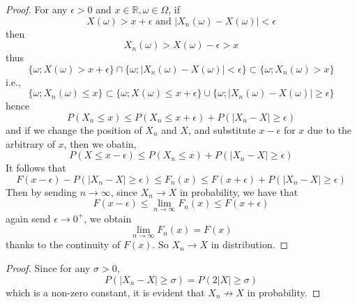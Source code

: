 \begin{subproblem}
        \item
        \begin{proof}
            For any $\epsilon>0$ and $x\in\mathbb R,\omega\in\Omega$,
            if
            \[X(\omega)>x+\epsilon\text{ and }
            |X_n(\omega)-X(\omega)|<\epsilon\]
            then
            \[X_n(\omega)>X(\omega)-\epsilon>x\]
            thus
            \[\{\omega;X(\omega)>x+\epsilon\}\cap
            \{\omega;|X_n(\omega)-X(\omega)|<\epsilon\}
            \subset \{\omega;X_n(\omega)>x\}\]
            i.e.,
            \[\{\omega;X_n(\omega)\leq x\}
            \subset\{\omega;X(\omega)\leq x+\epsilon\}
            \cup\{\omega;|X_n(\omega)-X(\omega)|\geq\epsilon\}\]
            hence
            \[P(X_n\leq x)\leq P(X_n\leq x+\epsilon)+P(|X_n-X|\geq\epsilon)\]
            and if we change the position of $X_n$ and $X$, and substitute
            $x-\epsilon$ for $x$ due to the arbitrary of $x$, then we obatin,
            \[P(X\leq x-\epsilon)\leq P(X_n\leq x)+P(|X_n-X|\geq\epsilon)\]
            It follows that
            \[F(x-\epsilon)-P(|X_n-X|\geq\epsilon)
            \leq F_n(x)\leq
            F(x+\epsilon)+P(|X_n-X|\geq\epsilon)\]
            Then by sending $n\to\infty$, since $X_n\to X$ in probability,
            we have that
            \[F(x-\epsilon)\leq\lim_{n\to\infty}F_n(x)\leq F(x+\epsilon)\]
            again send $\epsilon\to 0^+$, we obtain
            \[\lim_{n\to\infty}F_n(x)=F(x)\]
            thanks to the continuity of $F(x)$. So $X_n\to X$ in distribution.
        \end{proof}

        \item
        \begin{proof}
            Since for any $\sigma>0$,
            \[P(|X_n-X|\geq\sigma)=P(2|X|\geq\sigma)\]
            which is a non-zero constant, it is evident that
            $X_n\not\to X$ in probability.
        \end{proof}
    \end{subproblem}

